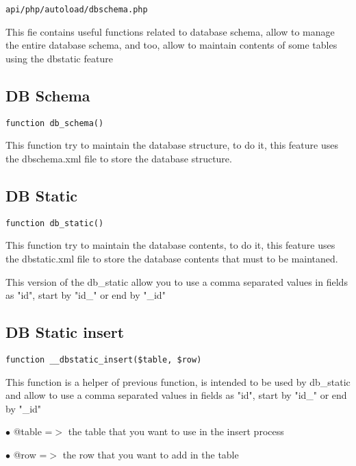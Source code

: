 \documentclass[a4paper]{book}
\begin{document}
\begin{lstlisting}
api/php/autoload/dbschema.php
\end{lstlisting}

This fie contains useful functions related to database schema, allow to manage the entire database
schema, and too, allow to maintain contents of some tables using the dbstatic feature

\hypertarget{toc86}{}
\subsection{DB Schema}

\begin{lstlisting}
function db_schema()
\end{lstlisting}

This function try to maintain the database structure, to do it, this feature uses the dbschema.xml
file to store the database structure.

\hypertarget{toc87}{}
\subsection{DB Static}

\begin{lstlisting}
function db_static()
\end{lstlisting}

This function try to maintain the database contents, to do it, this feature
uses the dbstatic.xml file to store the database contents that must to be
maintaned.

This version of the db\_static allow you to use a comma separated values in
fields as "id", start by "id\_" or end by "\_id"

\hypertarget{toc88}{}
\subsection{DB Static insert}

\begin{lstlisting}
function __dbstatic_insert($table, $row)
\end{lstlisting}

This function is a helper of previous function, is intended to be used by db\_static and
allow to use a comma separated values in fields as "id", start by "id\_" or end by "\_id"

\begin{compactitem}
\item[\color{myblue}$\bullet$] @table =$>$ the table that you want to use in the insert process
\item[\color{myblue}$\bullet$] @row   =$>$ the row that you want to add in the table
\end{compactitem}
\end{document}
